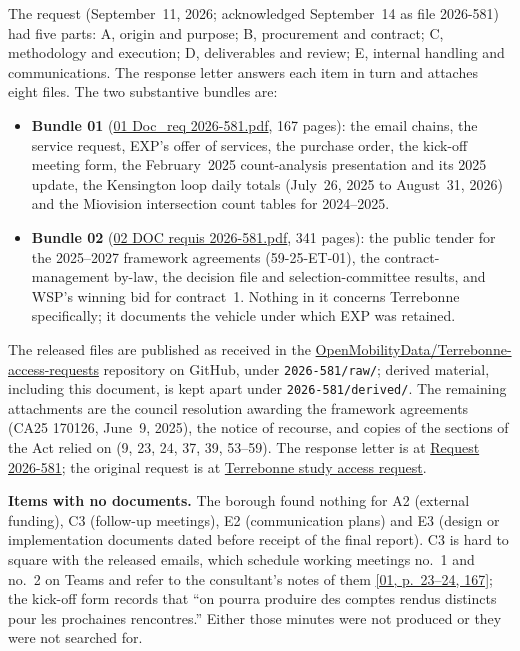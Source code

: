 \documentclass[11pt,letterpaper]{article}
\newcommand{\repourl}{https://github.com/OpenMobilityData/Terrebonne-access-requests}
\newcommand{\repo}[1]{\href{\repourl}{#1}}
\newcommand{\doc}[2]{\href{\repourl/blob/main/#1}{#2}}
\newcommand{\pagesurl}{https://openmobilitydata.github.io/Terrebonne-access-requests}
\newcommand{\pgl}[3]{\href{\pagesurl/\csname bundle#1\endcsname\#page=#2}{\textsf{\small[#1, p.~#3]}}}
\begin{document}
The request (September~11, 2026; acknowledged September~14 as file 2026-581)
had five parts: A, origin and purpose; B, procurement and contract; C,
methodology and execution; D, deliverables and review; E, internal handling
and communications. The response letter answers each item in turn and
attaches eight files. The two substantive bundles are:

\begin{itemize}[nosep]
  \item \textbf{Bundle 01} (\doc{2026-581/raw/01_emails_mandate_counts.pdf}{01 Doc\_req
    2026-581.pdf}, 167 pages): the email chains, the service request, EXP's
    offer of services, the purchase order, the kick-off meeting form, the
    February~2025 count-analysis presentation and its 2025 update, the
    Kensington loop daily totals (July~26, 2025 to August~31, 2026) and the
    Miovision intersection count tables for 2024--2025.
  \item \textbf{Bundle 02} (\doc{2026-581/raw/02_framework_agreement_tender.pdf}{02 DOC requis
    2026-581.pdf}, 341 pages): the public tender for the 2025--2027
    framework agreements (59-25-ET-01), the contract-management by-law, the
    decision file and selection-committee results, and WSP's winning bid for
    contract~1. Nothing in it concerns Terrebonne specifically; it documents
    the vehicle under which EXP was retained.
\end{itemize}

The released files are published as received in the \repo{OpenMobilityData/Terrebonne-access-requests} repository on GitHub, under \texttt{2026-581/raw/}; derived material, including this document, is kept apart under \texttt{2026-581/derived/}. The remaining attachments are the council resolution awarding the framework
agreements (CA25 170126, June~9, 2025), the notice of recourse, and copies
of the sections of the Act relied on (9, 23, 24, 37, 39, 53--59). The
response letter is at \doc{2026-581/raw/response_2026-10-09.pdf}{Request
2026-581}; the original request is at
\doc{2026-581/raw/request_2026-09-11.pdf}{Terrebonne study access request}.


\textbf{Items with no documents.} The borough found nothing for A2 (external
funding), C3 (follow-up meetings), E2 (communication plans) and E3 (design or
implementation documents dated before receipt of the final report). C3 is
hard to square with the released emails, which schedule working meetings
no.~1 and no.~2 on Teams and refer to the consultant's notes of them
\pgl{01}{23}{23--24, 167}; the kick-off form records that ``on pourra produire
des comptes rendus distincts pour les prochaines rencontres.'' Either those
minutes were not produced or they were not searched for.
\end{document}
